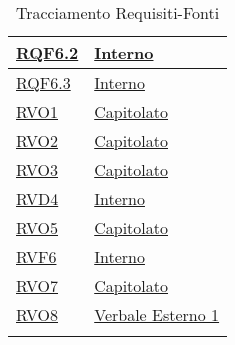 \begin{longtable}{|>{\centering}m{5cm}|m{5cm}<{\centering}|}
\hyperlink{RQF6.2}{RQF6.2} & \hyperlink{Interno}{Interno}\\ \hline

\hyperlink{RQF6.3}{RQF6.3} & \hyperlink{Interno}{Interno}\\ \hline

\hyperlink{RVO1}{RVO1} & \hyperlink{Capitolato}{Capitolato}\\ \hline

\hyperlink{RVO2}{RVO2} & \hyperlink{Capitolato}{Capitolato}\\ \hline

\hyperlink{RVO3}{RVO3} & \hyperlink{Capitolato}{Capitolato}\\ \hline

\hyperlink{RVD4}{RVD4} & \hyperlink{Interno}{Interno}\\ \hline

\hyperlink{RVO5}{RVO5} & \hyperlink{Capitolato}{Capitolato}\\ \hline

\hyperlink{RVF6}{RVF6} & \hyperlink{Interno}{Interno}\\ \hline

\hyperlink{RVO7}{RVO7} & \hyperlink{Capitolato}{Capitolato}\\ \hline

\hyperlink{RVO8}{RVO8} & \hyperlink{Verbale Esterno 1}{Verbale Esterno 1}\\ \hline

\caption[Tracciamento Requisiti-Fonti]{Tracciamento Requisiti-Fonti}
\label{tabella:requi-fonti}
\end{longtable}
\clearpage

